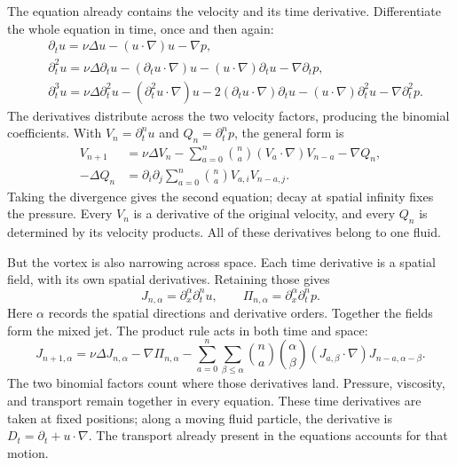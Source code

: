 The equation already contains the velocity and its time derivative.
Differentiate the whole equation in time, once and then again:
\[
 \begin{aligned}
 &\partial_tu=\nu\Delta u-(u\cdot\nabla)u-\nabla p,\\
 &\partial_t^2u=\nu\Delta\partial_tu-(\partial_tu\cdot\nabla)u
   -(u\cdot\nabla)\partial_tu-\nabla\partial_tp,\\
 &\partial_t^3u=\nu\Delta\partial_t^2u-(\partial_t^2u\cdot\nabla)u
   -2(\partial_tu\cdot\nabla)\partial_tu
   -(u\cdot\nabla)\partial_t^2u-\nabla\partial_t^2p.
 \end{aligned}
\]
The derivatives distribute across the two velocity factors, producing the
binomial coefficients. With \(V_n=\partial_t^nu\) and
\(Q_n=\partial_t^np\), the general form is
\[
 \begin{aligned}
 V_{n+1}&=\nu\Delta V_n
 -\sum_{a=0}^{n}\binom na(V_a\cdot\nabla)V_{n-a}-\nabla Q_n,\\
 -\Delta Q_n&=\partial_i\partial_j
   \sum_{a=0}^{n}\binom na V_{a,i}V_{n-a,j}.
 \end{aligned}
\]
Taking the divergence gives the second equation; decay at spatial infinity
fixes the pressure. Every \(V_n\) is a derivative of the original velocity,
and every \(Q_n\) is determined by its velocity products. All of these
derivatives belong to one fluid.

But the vortex is also narrowing across space. Each time derivative is a
spatial field, with its own spatial derivatives. Retaining those gives
\[
 J_{n,\alpha}=\partial_x^\alpha\partial_t^nu,
 \qquad \Pi_{n,\alpha}=\partial_x^\alpha\partial_t^np.
\]
Here \(\alpha\) records the spatial directions and derivative orders.
Together the fields form the mixed jet. The product rule acts in both
time and space:
\[
 J_{n+1,\alpha}=\nu\Delta J_{n,\alpha}-\nabla\Pi_{n,\alpha}
 -\sum_{a=0}^{n}\sum_{\beta\le\alpha}
   \binom na\binom\alpha\beta
   (J_{a,\beta}\cdot\nabla)J_{n-a,\alpha-\beta}.
\]
The two binomial factors count where those derivatives land. Pressure,
viscosity, and transport remain together in every equation. These time
derivatives are taken at fixed positions; along a moving fluid particle,
the derivative is \(D_t=\partial_t+u\cdot\nabla\). The transport already
present in the equations accounts for that motion.

